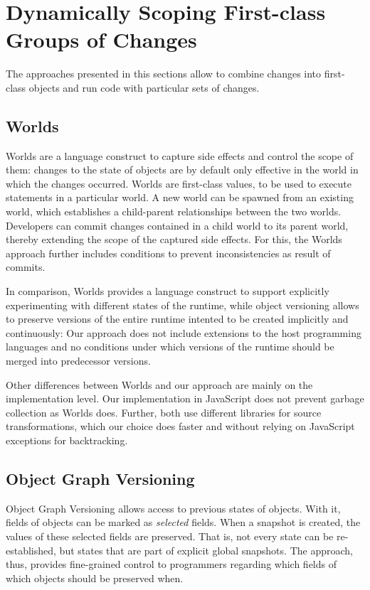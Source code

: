 \section{Dynamically Scoping First-class Groups of Changes}

The approaches presented in this sections allow to combine changes into first-class objects and run code with particular sets of changes.


\subsection{Worlds}

Worlds are a language construct to capture side effects and control the scope of them: changes to the state of objects are by default only effective in the world in which the changes occurred.
Worlds are first-class values, to be used to execute statements in a particular world.
A new world can be spawned from an existing world, which establishes a child-parent relationships between the two worlds.
Developers can commit changes contained in a child world to its parent world, thereby extending the scope of the captured side effects.
For this, the Worlds approach further includes conditions to prevent inconsistencies as result of commits.

In comparison, Worlds provides a language construct to support explicitly experimenting with different states of the runtime, while object versioning allows to preserve versions of the entire runtime intented to be created implicitly and continuously: Our approach does not include extensions to the host programming languages and no conditions under which versions of the runtime should be merged into predecessor versions.

Other differences between Worlds and our approach are mainly on the implementation level.
Our implementation in JavaScript does not prevent garbage collection as Worlds does.
Further, both use different libraries for source transformations, which our choice does faster and without relying on JavaScript exceptions for backtracking.


\subsection{Object Graph Versioning}

Object Graph Versioning\cite{Pluquet2009ECP} allows access to previous states of objects.
With it, fields of objects can be marked as \emph{selected} fields.
When a snapshot is created, the values of these selected fields are preserved.
That is, not every state can be re-established, but states that are part of explicit global snapshots. 
The approach, thus, provides fine-grained control to programmers regarding which fields of which objects should be preserved when.

